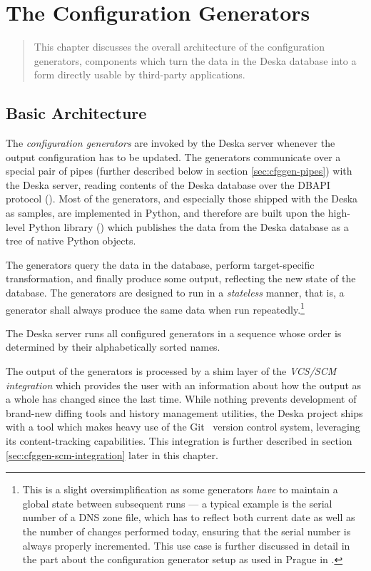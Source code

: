 \documentclass[deska]{subfiles}
\begin{document}
\chapter{The Configuration Generators}
\label{sec:config-generators}

\begin{abstract}
This chapter discusses the overall architecture of the configuration generators, components which turn the data in the
Deska database into a form directly usable by third-party applications.
\end{abstract}

\section{Basic Architecture}

The {\em configuration generators} are invoked by the Deska server whenever the output configuration has to be updated.
The generators communicate over a special pair of pipes (further described below in section \ref{sec:cfggen-pipes})
with the Deska server, reading contents of the Deska database over the DBAPI protocol ().
Most of the generators, and especially those shipped with the Deska as samples, are implemented in Python, and therefore
are built upon the high-level Python library () which publishes the data from the Deska
database as a tree of native Python objects.

The generators query the data in the database, perform target-specific transformation, and finally produce some output,
reflecting the new state of the database.  The generators are designed to run in a {\em stateless} manner, that is, a
generator shall always produce the same data when run repeatedly.\footnote{This is a slight oversimplification as some
generators {\em have} to maintain a global state between subsequent runs --- a typical example is the serial number of a
DNS zone file, which has to reflect both current date as well as the number of changes performed today, ensuring that
the serial number is always properly incremented.  This use case is further discussed in detail in the part about the
configuration generator setup as used in Prague in .}

The Deska server runs all configured generators in a sequence whose order is determined by their alphabetically sorted
names.

The output of the generators is processed by a shim layer of the {\em VCS/SCM integration} which provides the user with
an information about how the output as a whole has changed since the last time.  While nothing prevents development of
brand-new diffing tools and history management utilities, the Deska project ships with a tool which makes heavy use of
the Git~\cite{git} version control system, leveraging its content-tracking capabilities.  This integration is further
described in section \ref{sec:cfggen-scm-integration} later in this chapter.
\end{document}
